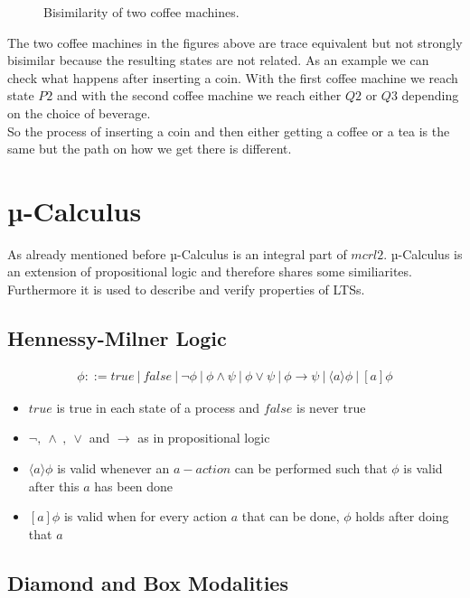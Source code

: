 \documentclass{clseminar}
\begin{document}
  \begin{figure}[!ht]
    \resizebox{\textwidth}{!}{}
    \caption{Bisimilarity of two coffee machines.}
    \label{fig:coffee_machines}
  \end{figure}

  The two coffee machines in the figures above are trace equivalent but not strongly bisimilar because the resulting states are not related. As an example we can check what happens after inserting a coin. With the first coffee machine we reach state $P2$ and with the second coffee machine we reach either $Q2$ or $Q3$ depending on the choice of beverage.\\
  So the process of inserting a coin and then either getting a coffee or a tea is the same but the path on how we get there is different.

  \section{µ-Calculus}
  As already mentioned before µ-Calculus is an integral part of $mcrl2$. µ-Calculus is an extension of propositional logic and therefore shares some similiarites. \\
  Furthermore it is used to describe and verify properties of LTSs.

  \subsection{Hennessy-Milner Logic}
  \begin{align*}
    \phi ::= \mathit{true}\ |\ \mathit{false}\ |\ \neg \phi\ |\ \phi \land \psi\ |\ \phi \lor \psi\ |\ \phi \to \psi\ |\ \langle a \rangle \phi \ |\ [a]\phi
  \end{align*}
  \begin{itemize}
    \item $\mathit{true}$ is true in each state of a process and $\mathit{false}$ is never true
    \item $\neg ,\ \land\ ,\ \lor$ and $\to$ as in propositional logic
    \item $\langle a \rangle \phi$ is valid whenever an $a-action$ can be performed such that $\phi$ is valid after this $a$ has been done
    \item $[a]\phi$ is valid when for every action $a$ that can be done, $\phi$ holds after doing that $a$
  \end{itemize}

  \subsection{Diamond and Box Modalities}
\end{document}
